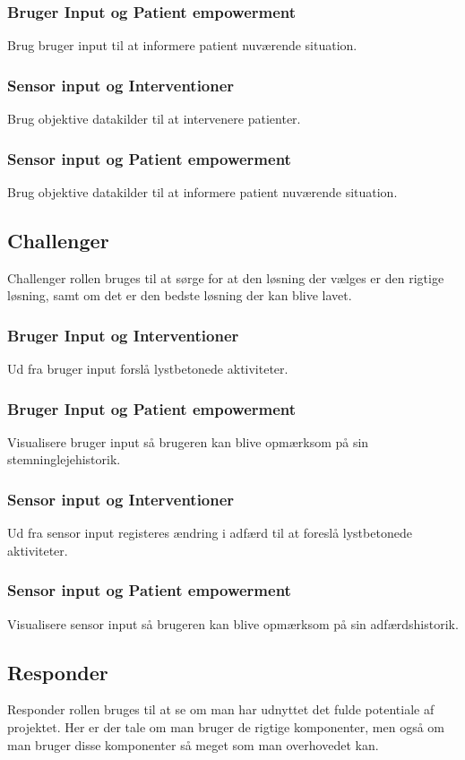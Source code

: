 \subsubsection*{Bruger Input og Patient empowerment}
Brug bruger input til at informere patient nuværende situation.
\subsubsection*{Sensor input og Interventioner}
Brug objektive datakilder til at intervenere patienter. 
\subsubsection*{Sensor input og Patient empowerment}
Brug objektive datakilder til at informere patient nuværende situation.

\subsection{Challenger}
Challenger rollen bruges til at sørge for at den løsning der vælges er den rigtige løsning, samt om det er den bedste løsning der kan blive lavet.

\subsubsection*{Bruger Input og Interventioner}
Ud fra bruger input forslå lystbetonede aktiviteter.
\subsubsection*{Bruger Input og Patient empowerment}
Visualisere bruger input så brugeren kan blive opmærksom på sin stemninglejehistorik.
\subsubsection*{Sensor input og Interventioner} 
Ud fra sensor input registeres ændring i adfærd til at foreslå lystbetonede aktiviteter.
\subsubsection*{Sensor input og Patient empowerment}
Visualisere sensor input så brugeren kan blive opmærksom på sin adfærdshistorik.

\subsection{Responder}
Responder rollen bruges til at se om man har udnyttet det fulde potentiale af projektet.
Her er der tale om man bruger de rigtige komponenter, men også om man bruger disse komponenter så meget som man overhovedet kan. 


